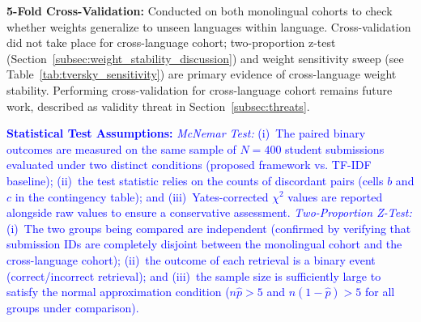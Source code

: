 \textbf{5-Fold Cross-Validation:} Conducted on both monolingual cohorts to check whether weights generalize to unseen languages within language. Cross-validation did not take place for cross-language cohort; two-proportion z-test (Section~\ref{subsec:weight_stability_discussion}) and weight sensitivity sweep (see Table~\ref{tab:tversky_sensitivity}) are primary evidence of cross-language weight stability. Performing cross-validation for cross-language cohort remains future work, described as validity threat in Section~\ref{subsec:threats}.

\textcolor{blue}{\textbf{Statistical Test Assumptions:} \textit{McNemar Test:} (i)~The paired binary outcomes are measured on the same sample of $N{=}400$ student submissions evaluated under two distinct conditions (proposed framework vs. TF-IDF baseline); (ii)~the test statistic relies on the counts of discordant pairs (cells $b$ and $c$ in the contingency table); and (iii)~Yates-corrected $\chi^2$ values are reported alongside raw values to ensure a conservative assessment. \textit{Two-Proportion Z-Test:} (i)~The two groups being compared are independent (confirmed by verifying that submission IDs are completely disjoint between the monolingual cohort and the cross-language cohort); (ii)~the outcome of each retrieval is a binary event (correct/incorrect retrieval); and (iii)~the sample size is sufficiently large to satisfy the normal approximation condition ($n\hat{p} > 5$ and $n(1-\hat{p}) > 5$ for all groups under comparison).}

